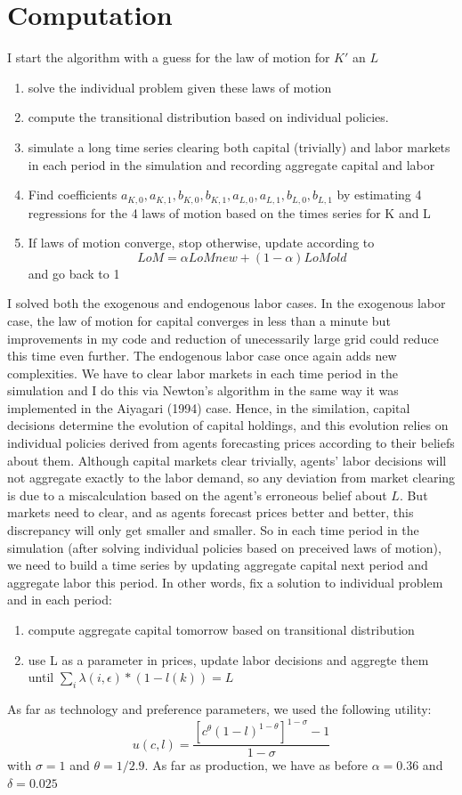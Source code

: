 \documentclass{article} %
\begin{document}
\section*{Computation}
I start the algorithm with a guess for the law of motion for $K'$ an $L$
\begin{enumerate}
\item solve the individual problem given these laws of motion
\item compute the transitional distribution based on individual policies.
\item simulate a long time series clearing both capital (trivially) and labor markets in each period in the simulation and recording aggregate capital and labor 
\item Find coefficients $a_{K,0},a_{K,1},b_{K,0},b_{K,1},a_{L,0},a_{L,1},b_{L,0},b_{L,1}$ by estimating 4 regressions for the 4 laws of motion based on the times series for K and L 
\item If laws of motion converge, stop otherwise, update according to
  $$ LoM = \alpha LoMnew + (1-\alpha) LoMold  $$
  and go back to 1
\end{enumerate}
I solved both the exogenous and endogenous labor cases. In the exogenous labor case, the law of motion for capital converges in less than a minute but improvements in my code and reduction of unecessarily large grid could reduce this time even further. The endogenous labor case once again adds new complexities. We have to clear labor markets in each time period in the simulation and I do this via Newton's algorithm in the same way it was implemented in the Aiyagari (1994) case. Hence, in the similation, capital decisions determine the evolution of capital holdings, and this evolution relies on individual policies derived from agents forecasting prices according to their beliefs about them. Although capital markets clear trivially, agents' labor decisions will not aggregate exactly to the labor demand, so any deviation from market clearing is due to a miscalculation based on the agent's erroneous belief about $L$. But markets need to clear, and as agents forecast prices better and better, this discrepancy will only get smaller and smaller. So in each time period in the simulation (after solving individual policies based on preceived laws of motion), we need to build a time series by updating aggregate capital next period and aggregate labor this period. In other words, fix a solution to individual problem and in each period:
\begin{enumerate}
\item compute aggregate capital tomorrow based on transitional distribution
\item use L as a parameter in prices, update labor decisions and aggregte them until $\sum_i\lambda(i,\epsilon)*(1-l(k)) = L$
  \end{enumerate}
As far as technology and preference parameters, we used the following utility:
$$ u(c,l) = \frac{[c^{\theta}(1-l)^{1-\theta}]^{1-\sigma}-1}{1-\sigma} $$
with $\sigma=1$ and $\theta=1/2.9$. As far as production, we have as before $\alpha=0.36$ and $\delta=0.025$ 
\end{document}

